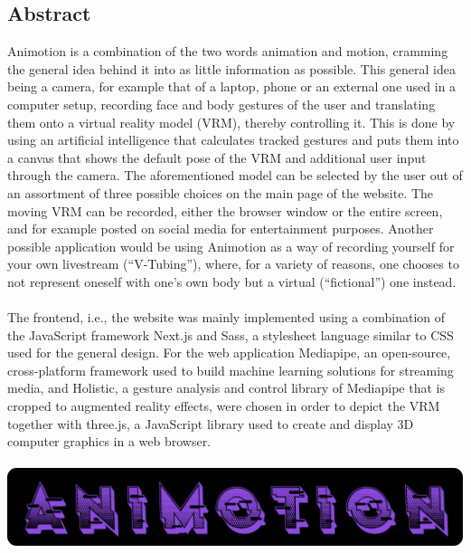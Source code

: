 \begin{spacing}{1}
    \chapter*{Abstract}
\end{spacing}
Animotion is a combination of the two words animation and motion, cramming the general idea behind it into as little information as possible. This general idea being a camera, for example that of a laptop, phone or an external one used in a computer setup, recording face and body gestures of the user and translating them onto a virtual reality model (VRM), thereby controlling it. This is done by using an artificial intelligence that calculates tracked gestures and puts them into a canvas that shows the default pose of the VRM and additional user input through the camera. The aforementioned model can be selected by the user out of an assortment of three possible choices on the main page of the website. The moving VRM can be recorded, either the browser window or the entire screen, and for example posted on social media for entertainment purposes. Another possible application would be using Animotion as a way of recording yourself for your own livestream (“V-Tubing”), where, for a variety of reasons, one chooses to not represent oneself with one’s own body but a virtual (“fictional”) one instead.
\\
\\
The frontend, i.e., the website was mainly implemented using a combination of the JavaScript framework Next.js and Sass, a stylesheet language similar to CSS used for the general design. For the web application Mediapipe, an open-source, cross-platform framework used to build machine learning solutions for streaming media, and Holistic, a gesture analysis and control library of Mediapipe that is cropped to augmented reality effects, were chosen in order to depict the VRM together with three.js, a JavaScript library used to create and display 3D computer graphics in a web browser.
\\
\\
\includegraphics[width=1\textwidth]{pics/animotionlogo.png}

